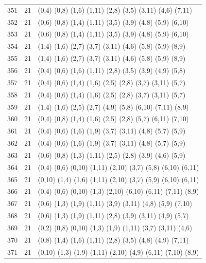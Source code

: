 \begin{appendix}
{\begin{longtable}{lll}
    351& 21 & (0,4)   (0,8)   (1,6)   (1,11)  (2,8)   (3,5)   (3,11)  (4,6)   (7,11)\\
    352& 21 & (0,6)   (0,8)   (1,4)   (1,11)  (3,5)   (3,9)   (4,8)   (5,9)   (6,10)\\
    353& 21 & (0,6)   (0,8)   (1,4)   (1,11)  (3,5)   (3,9)   (4,8)   (5,9)   (6,10)\\
    354& 21 & (1,4)   (1,6)   (2,7)   (3,7)   (3,11)  (4,6)   (5,8)   (5,9)   (8,9)\\
    355& 21 & (1,4)   (1,6)   (2,7)   (3,7)   (3,11)  (4,6)   (5,8)   (5,9)   (8,9)\\
    356& 21 & (0,4)   (0,6)   (1,6)   (1,11)  (2,8)   (3,5)   (3,9)   (4,9)   (5,8)\\
    357& 21 & (0,4)   (0,6)   (1,4)   (1,6)   (2,5)   (2,8)   (3,7)   (3,11)  (5,7)\\
    358& 21 & (0,4)   (0,6)   (1,4)   (1,6)   (2,5)   (2,8)   (3,7)   (3,11)  (5,7)\\
    359& 21 & (1,4)   (1,6)   (2,5)   (2,7)   (4,9)   (5,8)   (6,10)  (7,11)  (8,9)\\
    360& 21 & (0,4)   (0,8)   (1,4)   (1,6)   (2,5)   (2,8)   (5,7)   (6,11)  (7,10)\\
    361& 21 & (0,4)   (0,6)   (1,6)   (1,9)   (3,7)   (3,11)  (4,8)   (5,7)   (5,9)\\
    362& 21 & (0,4)   (0,6)   (1,6)   (1,9)   (3,7)   (3,11)  (4,8)   (5,7)   (5,9)\\
    363& 21 & (0,6)   (0,8)   (1,3)   (1,11)  (2,5)   (2,8)   (3,9)   (4,6)   (5,9)\\
    364& 21 & (0,4)   (0,6)   (0,10)  (1,11)  (2,10)  (3,7)   (5,8)   (6,10)  (6,11)\\
    365& 21 & (0,10)  (1,4)   (1,6)   (1,11)  (2,10)  (3,7)   (5,9)   (6,10)  (6,11)\\
    366& 21 & (0,4)   (0,6)   (0,10)  (1,3)   (2,10)  (6,10)  (6,11)  (7,11)  (8,9)\\
    367& 21 & (0,6)   (1,3)   (1,9)   (1,11)  (3,9)   (3,11)  (4,8)   (5,9)   (7,10)\\
    368& 21 & (0,6)   (1,3)   (1,9)   (1,11)  (2,8)   (3,9)   (3,11)  (4,9)   (5,7)\\
    369& 21 & (0,2)   (0,8)   (0,10)  (1,3)   (1,9)   (1,11)  (3,7)   (3,11)  (4,6)\\
    370& 21 & (0,8)   (1,4)   (1,6)   (1,11)  (2,8)   (3,5)   (4,8)   (4,9)   (7,11)\\
    371& 21 & (0,10)  (1,3)   (1,9)   (1,11)  (2,10)  (4,9)   (6,11)  (7,10)  (8,9)\\

\end{longtable}}
\end{appendix}

